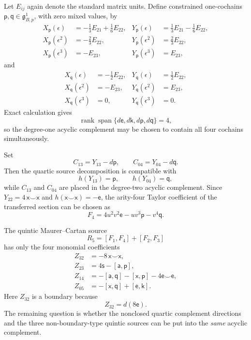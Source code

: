 \documentclass[11pt]{amsart}
\newcommand{\Span}{\operatorname{span}}
\newcommand{\rank}{\operatorname{rank}}
\newcommand{\ghoch}{\mathfrak g}
\begin{document}
Let $E_{ij}$ again denote the standard matrix units.  Define constrained one-cochains $\mathsf p,\mathsf q\in\ghoch^1_{B,p}$, with zero mixed values, by
\begin{align*}
X_{\mathsf p}(\epsilon)
&=-\tfrac13E_{21}+\tfrac16E_{22},
&Y_{\mathsf p}(\epsilon)
&=\tfrac13E_{21}-\tfrac16E_{22},\\
X_{\mathsf p}(\epsilon^2)
&=-\tfrac23E_{22},
&Y_{\mathsf p}(\epsilon^2)
&=\tfrac23E_{22},\\
X_{\mathsf p}(\epsilon^3)
&=-E_{23},
&Y_{\mathsf p}(\epsilon^3)
&=E_{23},
\end{align*}
and
\begin{align*}
X_{\mathsf q}(\epsilon)
&=-\tfrac12E_{22},
&Y_{\mathsf q}(\epsilon)
&=\tfrac12E_{22},\\
X_{\mathsf q}(\epsilon^2)
&=-E_{23},
&Y_{\mathsf q}(\epsilon^2)
&=E_{23},\\
X_{\mathsf q}(\epsilon^3)
&=0,
&Y_{\mathsf q}(\epsilon^3)
&=0.
\end{align*}
Exact calculation gives
\begin{equation}\label{eq:arity5-degree1-rank}
\rank\Span\{d\mathsf e,d\mathsf k,d\mathsf p,d\mathsf q\}=4,
\end{equation}
so the degree-one acyclic complement may be chosen to contain all four cochains simultaneously.

Set
\begin{equation}\label{eq:arity5-quartic-complement}
C_{13}=Y_{13}-d\mathsf p,
\qquad
C_{04}=Y_{04}-d\mathsf q.
\end{equation}
Then the quartic source decomposition is compatible with
\[
h(Y_{13})=\mathsf p,
\qquad
h(Y_{04})=\mathsf q,
\]
while $C_{13}$ and $C_{04}$ are placed in the degree-two acyclic complement.  Since $Y_{22}=4\,\mathsf x\smile\mathsf x$ and $h(\mathsf x\smile\mathsf x)=-\mathsf e$, the arity-four Taylor coefficient of the transferred section can be chosen as
\begin{equation}\label{eq:intrinsic-F4}
F_4
=
4u^2v^2\mathsf e
-uv^3\mathsf p
-v^4\mathsf q.
\end{equation}

The quintic Maurer--Cartan source
\[
R_5=[F_1,F_4]+[F_2,F_3]
\]
has only the four monomial coefficients
\begin{align}
Z_{32}&=-8\,\mathsf x\smile\mathsf x,\label{eq:arity5-Z32}\\
Z_{23}&=4\mathsf s-[\mathsf a,\mathsf p],\label{eq:arity5-Z23}\\
Z_{14}&=-[\mathsf a,\mathsf q]-[\mathsf x,\mathsf p]-4\mathsf e\smile\mathsf e,\label{eq:arity5-Z14}\\
Z_{05}&=-[\mathsf x,\mathsf q]+[\mathsf e,\mathsf k].\label{eq:arity5-Z05}
\end{align}
Here $Z_{32}$ is a boundary because
\[
Z_{32}=d(8\mathsf e).
\]
The remaining question is whether the nonclosed quartic complement directions and the three non-boundary-type quintic sources can be put into the \emph{same} acyclic complement.
\end{document}
